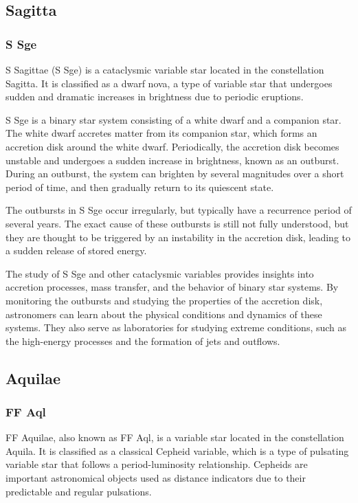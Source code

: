 \subsection{Sagitta}
\subsubsection*{ S Sge }
S Sagittae (S Sge) is a cataclysmic variable star located in the constellation Sagitta. It is classified as a dwarf nova, a type of variable star that undergoes sudden and dramatic increases in brightness due to periodic eruptions.

S Sge is a binary star system consisting of a white dwarf and a companion star. The white dwarf accretes matter from its companion star, which forms an accretion disk around the white dwarf. Periodically, the accretion disk becomes unstable and undergoes a sudden increase in brightness, known as an outburst. During an outburst, the system can brighten by several magnitudes over a short period of time, and then gradually return to its quiescent state.

The outbursts in S Sge occur irregularly, but typically have a recurrence period of several years. The exact cause of these outbursts is still not fully understood, but they are thought to be triggered by an instability in the accretion disk, leading to a sudden release of stored energy.

The study of S Sge and other cataclysmic variables provides insights into accretion processes, mass transfer, and the behavior of binary star systems. By monitoring the outbursts and studying the properties of the accretion disk, astronomers can learn about the physical conditions and dynamics of these systems. They also serve as laboratories for studying extreme conditions, such as the high-energy processes and the formation of jets and outflows.

\subsection{Aquilae}
\subsubsection*{ FF Aql }
FF Aquilae, also known as FF Aql, is a variable star located in the constellation Aquila. It is classified as a classical Cepheid variable, which is a type of pulsating variable star that follows a period-luminosity relationship. Cepheids are important astronomical objects used as distance indicators due to their predictable and regular pulsations.

